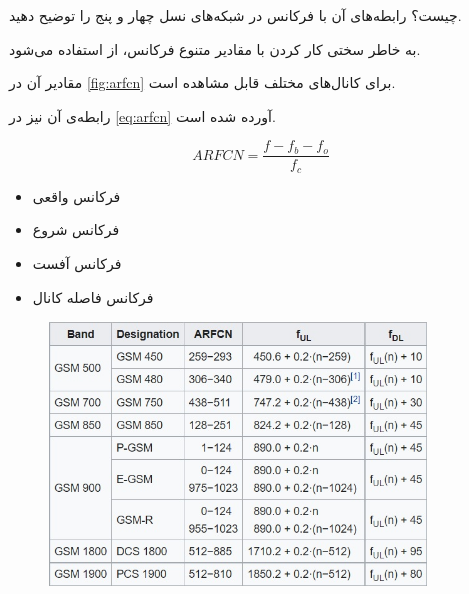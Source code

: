 \Question
{ 
چیست؟ رابطه‌های آن با فرکانس در شبکه‌های نسل چهار و پنج را توضیح دهید.}
{
	به خاطر سختی کار کردن با مقادیر متنوع فرکانس، از 
استفاده می‌شود.

مقادیر آن در 
\autoref{fig:arfcn}
برای کانال‌های مختلف قابل مشاهده است.

رابطه‌ی آن نیز در 
\autoref{eq:arfcn}
آورده شده است.

\begin{equation}
	\label{eq:arfcn}
    ARFCN = \frac{f - f_b - f_o}{f_c}
\end{equation}

\begin{itemize}
	\item {}
	فرکانس واقعی
	\item {}
فرکانس شروع 
	\item {}
فرکانس آفست
	\item {}
فرکانس فاصله کانال 
\end{itemize}

\begin{figure}[H]
	\includegraphics[width=10cm]{Images/ARFCN.jpg}
	\centering
	\caption{}
	\label{fig:arfcn}
\end{figure}
}
